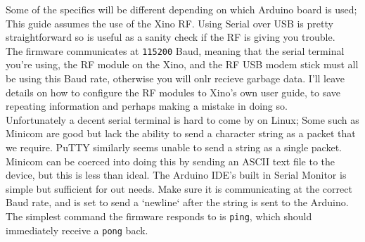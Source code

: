 Some of the specifics will be different depending on which Arduino board is used; This guide assumes the use of the Xino RF. Using Serial over USB is pretty straightforward so is useful as a sanity check if the RF is giving you trouble.\\

The firmware communicates at \texttt{115200} Baud, meaning that the serial terminal you're using, the RF module on the Xino, and the RF USB modem stick must all be using this Baud rate, otherwise you will onlr recieve garbage data. I'll leave details on how to configure the RF modules to Xino's own user guide, to save repeating information and perhaps making a mistake in doing so.\\

Unfortunately a decent serial terminal is hard to come by on Linux; Some such as Minicom are good but lack the ability to send a character string as a packet that we require. PuTTY similarly seems unable to send a string as a single packet. Minicom can be coerced into doing this by sending an ASCII text file to the device, but this is less than ideal. The Arduino IDE's built in Serial Monitor is simple but sufficient for out needs. Make sure it is communicating at the correct Baud rate, and is set to send a `newline` after the string is sent to the Arduino.\\

The simplest command the firmware responds to is \texttt{ping}, which should immediately receive a \texttt{pong} back.
